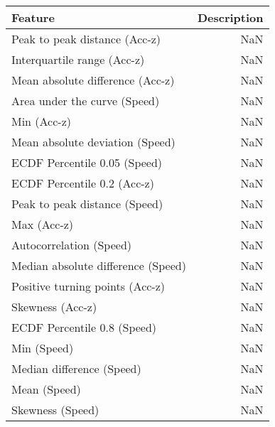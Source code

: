 \begin{table}
\centering
\label{table:reg_fs}
\begin{tabular}{lr}
\toprule
                  \textbf{Feature} & \textbf{Description} \\
\midrule
     Peak to peak distance (Acc-z) &                  NaN \\
       Interquartile range (Acc-z) &                  NaN \\
  Mean absolute difference (Acc-z) &                  NaN \\
      Area under the curve (Speed) &                  NaN \\
                       Min (Acc-z) &                  NaN \\
   Mean absolute deviation (Speed) &                  NaN \\
      ECDF Percentile 0.05 (Speed) &                  NaN \\
       ECDF Percentile 0.2 (Acc-z) &                  NaN \\
     Peak to peak distance (Speed) &                  NaN \\
                       Max (Acc-z) &                  NaN \\
           Autocorrelation (Speed) &                  NaN \\
Median absolute difference (Speed) &                  NaN \\
   Positive turning points (Acc-z) &                  NaN \\
                  Skewness (Acc-z) &                  NaN \\
       ECDF Percentile 0.8 (Speed) &                  NaN \\
                       Min (Speed) &                  NaN \\
         Median difference (Speed) &                  NaN \\
                      Mean (Speed) &                  NaN \\
                  Skewness (Speed) &                  NaN \\
\bottomrule
\end{tabular}
\end{table}
